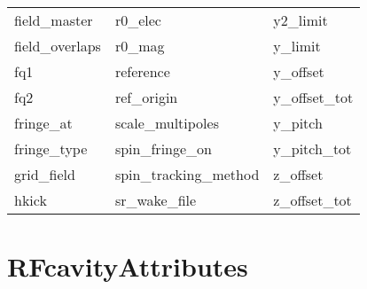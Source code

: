 \begin{tabular}{lll}
field_master                & r0_elec                     & y2_limit                    \\
field_overlaps              & r0_mag                      & y_limit                     \\
fq1                         & reference                   & y_offset                    \\
fq2                         & ref_origin                  & y_offset_tot                \\
fringe_at                   & scale_multipoles            & y_pitch                     \\
fringe_type                 & spin_fringe_on              & y_pitch_tot                 \\
grid_field                  & spin_tracking_method        & z_offset                    \\
hkick                       & sr_wake_file                & z_offset_tot                \\
 \bottomrule
 \end{tabular}
 \vfill
 
 \section{RFcavityAttributes}
 \label{s:list.rfcavity}
 
